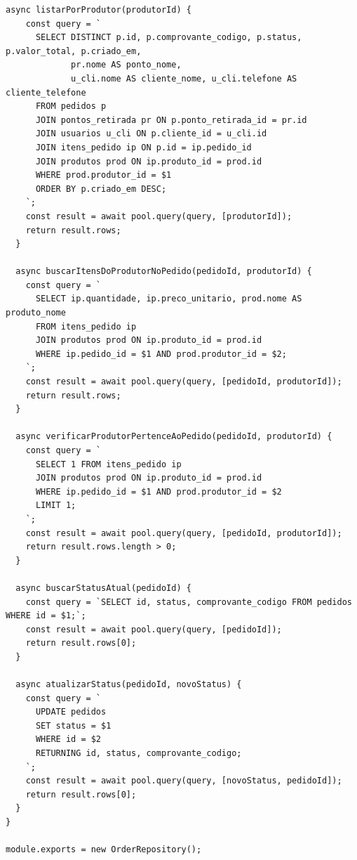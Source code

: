 \begin{lstlisting}[caption={src/modules/order/order.repository.js}]
  async listarPorProdutor(produtorId) {
    const query = `
      SELECT DISTINCT p.id, p.comprovante_codigo, p.status, p.valor_total, p.criado_em,
             pr.nome AS ponto_nome,
             u_cli.nome AS cliente_nome, u_cli.telefone AS cliente_telefone
      FROM pedidos p
      JOIN pontos_retirada pr ON p.ponto_retirada_id = pr.id
      JOIN usuarios u_cli ON p.cliente_id = u_cli.id
      JOIN itens_pedido ip ON p.id = ip.pedido_id
      JOIN produtos prod ON ip.produto_id = prod.id
      WHERE prod.produtor_id = $1
      ORDER BY p.criado_em DESC;
    `;
    const result = await pool.query(query, [produtorId]);
    return result.rows;
  }

  async buscarItensDoProdutorNoPedido(pedidoId, produtorId) {
    const query = `
      SELECT ip.quantidade, ip.preco_unitario, prod.nome AS produto_nome
      FROM itens_pedido ip
      JOIN produtos prod ON ip.produto_id = prod.id
      WHERE ip.pedido_id = $1 AND prod.produtor_id = $2;
    `;
    const result = await pool.query(query, [pedidoId, produtorId]);
    return result.rows;
  }

  async verificarProdutorPertenceAoPedido(pedidoId, produtorId) {
    const query = `
      SELECT 1 FROM itens_pedido ip
      JOIN produtos prod ON ip.produto_id = prod.id
      WHERE ip.pedido_id = $1 AND prod.produtor_id = $2
      LIMIT 1;
    `;
    const result = await pool.query(query, [pedidoId, produtorId]);
    return result.rows.length > 0;
  }

  async buscarStatusAtual(pedidoId) {
    const query = `SELECT id, status, comprovante_codigo FROM pedidos WHERE id = $1;`;
    const result = await pool.query(query, [pedidoId]);
    return result.rows[0];
  }

  async atualizarStatus(pedidoId, novoStatus) {
    const query = `
      UPDATE pedidos 
      SET status = $1 
      WHERE id = $2 
      RETURNING id, status, comprovante_codigo;
    `;
    const result = await pool.query(query, [novoStatus, pedidoId]);
    return result.rows[0];
  }
}

module.exports = new OrderRepository();\end{lstlisting}
\vspace{0.5cm}
